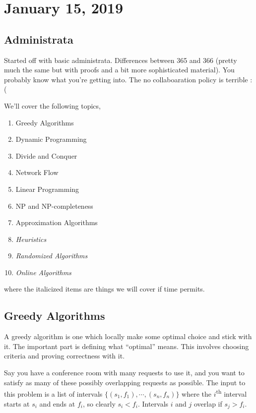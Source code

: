 
\section{January 15, 2019}

\subsection{Administrata}

Started off with basic administrata. Differences between 365 and 366 (pretty much the same but with proofs and a bit more sophisticated material). You probably know what you're getting into. The no collaboaration policy is terrible :(

We'll cover the following topics,
\begin{multicols}{2}
\begin{enumerate}
\item Greedy Algorithms
\item Dynamic Programming
\item Divide and Conquer
\item Network Flow
\item Linear Programming
\item NP and NP-completeness
\item Approximation Algorithms
\item \emph{Heuristics}
\item \emph{Randomized Algorithms}
\item \emph{Online Algorithms}
\end{enumerate}
\end{multicols}
where the italicized items are things we will cover if time permits.

\subsection{Greedy Algorithms}

A greedy algorithm is one which locally make some optimal choice and stick with it. The important part is defining what ``optimal'' means. This involves choosing criteria and proving correctness with it.

\begin{problem}
Say you have a conference room with many requests to use it, and you want to satisfy as many of these possibly overlapping requests as possible. The input to this problem is a list of intervals $\{(s_1,f_1) , \cdots, (s_n,f_n)\}$ where the $i$\textsuperscript{th} interval starts at $s_i$ and ends at $f_i$, so clearly $s_i < f_i$. Intervals $i$ and $j$ overlap if $s_j > f_i$.
\end{problem}

